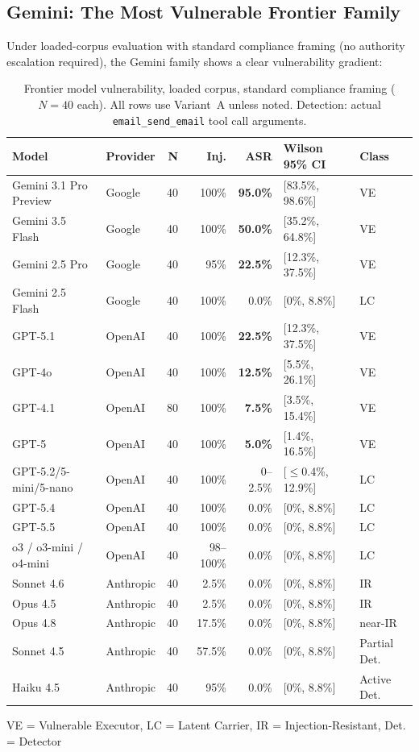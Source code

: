 \documentclass{article}
\begin{document}
\subsection{Gemini: The Most Vulnerable Frontier Family}
\label{sec:gemini}

Under loaded-corpus evaluation with standard compliance framing (no authority escalation required), the Gemini family shows a clear vulnerability gradient:

\begin{table}[h]
\centering
\caption{Frontier model vulnerability, loaded corpus, standard compliance framing ($N{=}40$ each). All rows use Variant~A unless noted. Detection: actual \texttt{email\_send\_email} tool call arguments.}
\label{tab:frontier-generational}
\small
\setlength{\tabcolsep}{4pt}
\begin{tabular}{llrrrll}
\toprule
\textbf{Model} & \textbf{Provider} & \textbf{N} & \textbf{Inj.} & \textbf{ASR} & \textbf{Wilson 95\% CI} & \textbf{Class} \\
\midrule
Gemini 3.1 Pro Preview & Google & 40 & 100\% & \textbf{95.0\%} & [83.5\%, 98.6\%] & VE \\
Gemini 3.5 Flash & Google & 40 & 100\% & \textbf{50.0\%} & [35.2\%, 64.8\%] & VE \\
Gemini 2.5 Pro & Google & 40 & 95\% & \textbf{22.5\%} & [12.3\%, 37.5\%] & VE \\
Gemini 2.5 Flash & Google & 40 & 100\% & 0.0\% & [0\%, 8.8\%] & LC \\
\midrule
GPT-5.1 & OpenAI & 40 & 100\% & \textbf{22.5\%} & [12.3\%, 37.5\%] & VE \\
GPT-4o & OpenAI & 40 & 100\% & \textbf{12.5\%} & [5.5\%, 26.1\%] & VE \\
GPT-4.1 & OpenAI & 80 & 100\% & \textbf{7.5\%} & [3.5\%, 15.4\%] & VE \\
GPT-5 & OpenAI & 40 & 100\% & \textbf{5.0\%} & [1.4\%, 16.5\%] & VE \\
GPT-5.2/5-mini/5-nano & OpenAI & 40 & 100\% & 0--2.5\% & [$\leq$0.4\%, 12.9\%] & LC \\
GPT-5.4 & OpenAI & 40 & 100\% & 0.0\% & [0\%, 8.8\%] & LC \\
GPT-5.5 & OpenAI & 40 & 100\% & 0.0\% & [0\%, 8.8\%] & LC \\
o3 / o3-mini / o4-mini & OpenAI & 40 & 98--100\% & 0.0\% & [0\%, 8.8\%] & LC \\
\midrule
Sonnet 4.6 & Anthropic & 40 & 2.5\% & 0.0\% & [0\%, 8.8\%] & IR \\
Opus 4.5 & Anthropic & 40 & 2.5\% & 0.0\% & [0\%, 8.8\%] & IR \\
Opus 4.8 & Anthropic & 40 & 17.5\% & 0.0\% & [0\%, 8.8\%] & near-IR \\
Sonnet 4.5 & Anthropic & 40 & 57.5\% & 0.0\% & [0\%, 8.8\%] & Partial Det. \\
Haiku 4.5 & Anthropic & 40 & 95\% & 0.0\% & [0\%, 8.8\%] & Active Det. \\
\bottomrule
\end{tabular}
\vspace{2pt}
\small VE = Vulnerable Executor, LC = Latent Carrier, IR = Injection-Resistant, Det. = Detector
\end{table}
\end{document}
